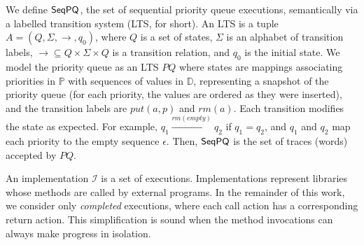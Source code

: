 We define $\mathsf{SeqPQ}$, the set of sequential priority queue executions, semantically via a labelled transition system (LTS, for short). An LTS is a tuple $A=(Q,\Sigma,\rightarrow,q_0)$, where $Q$ is a set of states, $\Sigma$ is an alphabet of transition labels, $\rightarrow\subseteq Q\times\Sigma\times Q$ is a transition relation, and $q_0$ is the initial state. We model the priority queue as an LTS $\textit{PQ}$ where states are mappings associating priorities in $\mathbb{P}$ with sequences of values in $\mathbb{D}$, representing a snapshot of the priority queue (for each priority, the values are ordered as they were inserted), and the transition labels are $\textit{put}(a,p)$ and $\textit{rm}(a)$. Each transition modifies the state as expected. For example, $q_1 \xrightarrow{\textit{rm}(\textit{empty})} q_2$ if $q_1 = q_2$, and $q_1$ and $q_2$ map each priority to the empty sequence $\epsilon$. Then, $\mathsf{SeqPQ}$ is the set of traces (words) accepted by $\textit{PQ}$. %


An implementation $\mathcal{I}$ is a set of executions. Implementations represent libraries whose methods are called by external programs. In the remainder of this work, we consider only \emph{completed} executions, where each call action has a corresponding return action. This simplification is sound when the method invocations can always make progress in isolation. 





